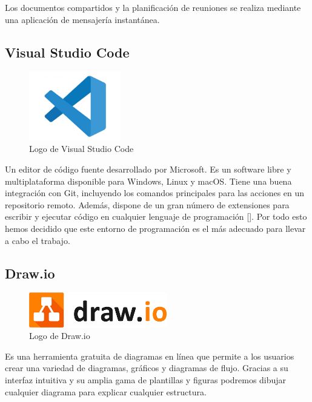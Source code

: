 Los documentos compartidos y la planificación de reuniones se realiza mediante una aplicación de mensajería instantánea.

\subsection{Visual Studio Code}

\begin{figure}[H]
    \centering
    \includegraphics[width=4cm]{archivos/tfg_jorge/logos/vscode}
    \caption{Logo de Visual Studio Code}\label{sistemass2}
\end{figure}

Un editor de código fuente desarrollado por Microsoft. Es un software libre y multiplataforma disponible para Windows, Linux y macOS. Tiene una buena integración con Git, incluyendo los comandos principales para las acciones en un repositorio remoto. Además, dispone de un gran número de extensiones para escribir y  ejecutar código en cualquier lenguaje de programación [\cite{def_vscode}].
Por todo esto hemos decidido que este entorno de programación es el más adecuado para llevar a cabo el trabajo.

\subsection{Draw.io}

\begin{figure}[H]
    \centering
    \includegraphics[width=6cm]{archivos/tfg_jorge/logos/drawio}
    \caption{Logo de Draw.io}\label{sistemass2}
\end{figure}

Es una herramienta gratuita de diagramas en línea que permite a los usuarios crear una variedad de diagramas, gráficos y diagramas de flujo. Gracias a su interfaz intuitiva y su amplia gama de plantillas y figuras podremos dibujar cualquier diagrama para explicar cualquier estructura.

